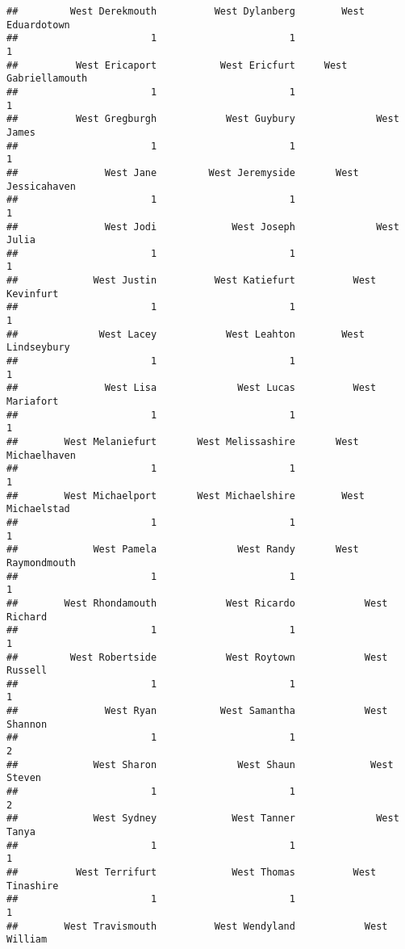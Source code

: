 \documentclass[
]{article}
\begin{document}
\begin{verbatim}
##         West Derekmouth          West Dylanberg        West Eduardotown 
##                       1                       1                       1 
##          West Ericaport           West Ericfurt     West Gabriellamouth 
##                       1                       1                       1 
##          West Gregburgh            West Guybury              West James 
##                       1                       1                       1 
##               West Jane         West Jeremyside       West Jessicahaven 
##                       1                       1                       1 
##               West Jodi             West Joseph              West Julia 
##                       1                       1                       1 
##             West Justin          West Katiefurt          West Kevinfurt 
##                       1                       1                       1 
##              West Lacey            West Leahton        West Lindseybury 
##                       1                       1                       1 
##               West Lisa              West Lucas          West Mariafort 
##                       1                       1                       1 
##        West Melaniefurt       West Melissashire       West Michaelhaven 
##                       1                       1                       1 
##        West Michaelport       West Michaelshire        West Michaelstad 
##                       1                       1                       1 
##             West Pamela              West Randy       West Raymondmouth 
##                       1                       1                       1 
##        West Rhondamouth            West Ricardo            West Richard 
##                       1                       1                       1 
##         West Robertside            West Roytown            West Russell 
##                       1                       1                       1 
##               West Ryan           West Samantha            West Shannon 
##                       1                       1                       2 
##             West Sharon              West Shaun             West Steven 
##                       1                       1                       2 
##             West Sydney             West Tanner              West Tanya 
##                       1                       1                       1 
##          West Terrifurt             West Thomas          West Tinashire 
##                       1                       1                       1 
##        West Travismouth          West Wendyland            West William 

\end{verbatim}
\end{document}
